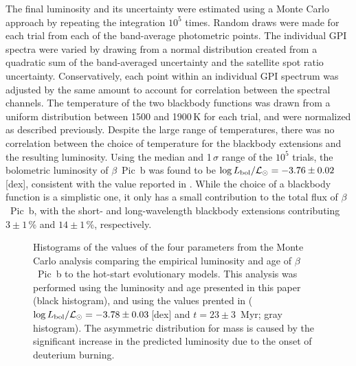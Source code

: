 \documentclass[twocolumn]{aastex6}
\begin{document}
The final luminosity and its uncertainty were estimated using a Monte Carlo approach by repeating the integration $10^5$ times. Random draws were made for each trial from each of the band-average photometric points. The individual GPI spectra were varied by drawing from a normal distribution created from a quadratic sum of the band-averaged uncertainty and the satellite spot ratio uncertainty. Conservatively, each point within an individual GPI spectrum was adjusted by the same amount to account for correlation between the spectral channels. The temperature of the two blackbody functions was drawn from a uniform distribution between 1500 and 1900\,K for each trial, and were normalized as described previously. Despite the large range of temperatures, there was no correlation between the choice of temperature for the blackbody extensions and the resulting luminosity. Using the median and 1\,$\sigma$ range of the $10^5$ trials, the bolometric luminosity of $\beta$~Pic~b was found to be $\log L_{\rm bol}/{\mathcal L}_{\odot}=-3.76\pm0.02$\,[dex], consistent with the value reported in \citet{Morzinski2015}. While the choice of a blackbody function is a simplistic one, it only has a small contribution to the total flux of $\beta$~Pic~b, with the short- and long-wavelength blackbody extensions contributing $3\pm1$\,\% and $14\pm1$\,\%, respectively.


\begin{figure}
\caption{Histograms of the values of the four parameters from the Monte Carlo analysis comparing the empirical luminosity and age of $\beta$~Pic~b to the \citet{2003A&A...402..701B} hot-start evolutionary models. This analysis was performed using the luminosity and age presented in this paper (black histogram), and using the values prented in \citet{Morzinski2015} ($\log L_{\rm bol}/{\mathcal L}_{\odot} = -3.78\pm0.03$\,[dex] and $t = 23\pm3$~Myr; gray histogram). The asymmetric distribution for mass is caused by the significant increase in the predicted luminosity due to the onset of deuterium burning.}
\label{fig:params}
\end{figure}
\end{document}
